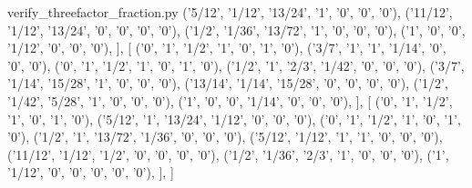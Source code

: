 \begin{filecontents*}[overwrite]{verify_threefactor_fraction.py}
        ('5/12', '1/12', '13/24', '1', '0', '0', '0'),
        ('11/12', '1/12', '13/24', '0', '0', '0', '0'),
        ('1/2', '1/36', '13/72', '1', '0', '0', '0'),
        ('1', '0', '0', '1/12', '0', '0', '0'),
    ],
    [
        ('0', '1', '1/2', '1', '0', '1', '0'),
        ('3/7', '1', '1', '1/14', '0', '0', '0'),
        ('0', '1', '1/2', '1', '0', '1', '0'),
        ('1/2', '1', '2/3', '1/42', '0', '0', '0'),
        ('3/7', '1/14', '15/28', '1', '0', '0', '0'),
        ('13/14', '1/14', '15/28', '0', '0', '0', '0'),
        ('1/2', '1/42', '5/28', '1', '0', '0', '0'),
        ('1', '0', '0', '1/14', '0', '0', '0'),
    ],
    [
        ('0', '1', '1/2', '1', '0', '1', '0'),
        ('5/12', '1', '13/24', '1/12', '0', '0', '0'),
        ('0', '1', '1/2', '1', '0', '1', '0'),
        ('1/2', '1', '13/72', '1/36', '0', '0', '0'),
        ('5/12', '1/12', '1', '1', '0', '0', '0'),
        ('11/12', '1/12', '1/2', '0', '0', '0', '0'),
        ('1/2', '1/36', '2/3', '1', '0', '0', '0'),
        ('1', '1/12', '0', '0', '0', '0', '0'),
    ],
]


\end{filecontents*}
